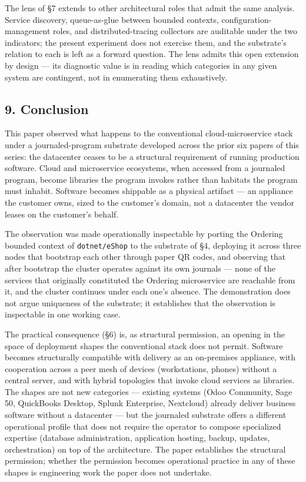 \documentclass[
]{article}
\newcounter{none} %
\begin{document}
The lens of §7 extends to other architectural roles that admit the same
analysis. Service discovery, queue-as-glue between bounded contexts,
configuration-management roles, and distributed-tracing collectors are
auditable under the two indicators; the present experiment does not
exercise them, and the substrate's relation to each is left as a forward
question. The lens admits this open extension by design --- its
diagnostic value is in reading which categories in any given system are
contingent, not in enumerating them exhaustively.

\subsection{9. Conclusion}\label{conclusion}

This paper observed what happens to the conventional cloud-microservice
stack under a journaled-program substrate developed across the prior six
papers of this series: the datacenter ceases to be a structural
requirement of running production software. Cloud and microservice
ecosystems, when accessed from a journaled program, become libraries the
program invokes rather than habitats the program must inhabit. Software
becomes shippable as a physical artifact --- an appliance the customer
owns, sized to the customer's domain, not a datacenter the vendor leases
on the customer's behalf.

The observation was made operationally inspectable by porting the
Ordering bounded context of \texttt{dotnet/eShop} to the substrate of
§4, deploying it across three nodes that bootstrap each other through
paper QR codes, and observing that after bootstrap the cluster operates
against its own journals --- none of the services that originally
constituted the Ordering microservice are reachable from it, and the
cluster continues under each one's absence. The demonstration does not
argue uniqueness of the substrate; it establishes that the observation
is inspectable in one working case.

The practical consequence (§6) is, as structural permission, an opening
in the space of deployment shapes the conventional stack does not
permit. Software becomes structurally compatible with delivery as an
on-premises appliance, with cooperation across a peer mesh of devices
(workstations, phones) without a central server, and with hybrid
topologies that invoke cloud services as libraries. The shapes are not
new categories --- existing systems (Odoo Community, Sage 50, QuickBooks
Desktop, Splunk Enterprise, Nextcloud) already deliver business software
without a datacenter --- but the journaled substrate offers a different
operational profile that does not require the operator to compose
specialized expertise (database administration, application hosting,
backup, updates, orchestration) on top of the architecture. The paper
establishes the structural permission; whether the permission becomes
operational practice in any of these shapes is engineering work the
paper does not undertake.
\end{document}
